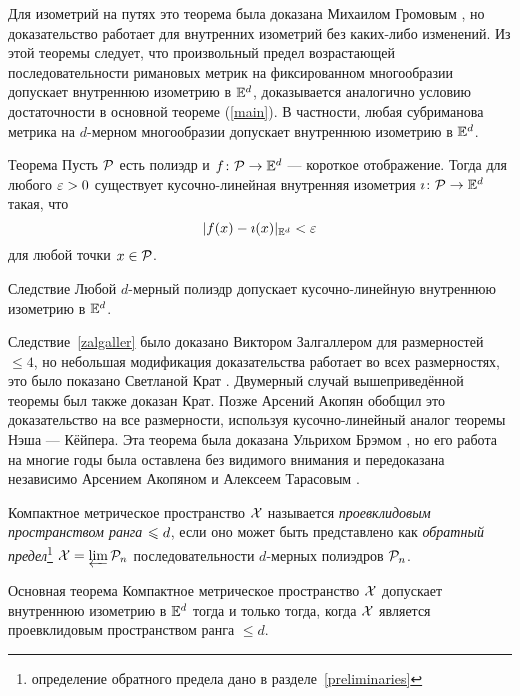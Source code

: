 \documentclass[oneside,a4paper]{article}
\begin{document}
Для изометрий на путях это теорема была доказана Михаилом Громовым \cite[2.4.11]{gromov-PDE},
но доказательство работает для внутренних изометрий  без каких-либо изменений.
Из этой теоремы следует, что произвольный предел возрастающей последовательности римановых метрик на фиксированном многообразии допускает внутреннюю изометрию в $\mathbb{E}^d$,
доказывается аналогично условию достаточности в основной теореме (\ref{main}).
В частности, любая субриманова метрика на $d$-мерном многообразии допускает внутреннюю изометрию в $\mathbb{E}^d$.

\begin{thm}{Теорема}\label{PL-Nash}
Пусть $\mathcal{P}$ есть полиэдр и $f\colon \mathcal{P}\to\mathbb{E}^d$ --- короткое отображение.
Тогда для любого $\varepsilon>0$ существует кусочно-линейная внутренняя изометрия $\imath\colon \mathcal{P}\to \mathbb{E}^d$ 
такая, что
$$|f(x)-\imath(x)|_{\mathbb{E}^d}<\varepsilon$$
для любой точки $x\in \mathcal{P}$.
\end{thm}

\begin{thm}{Следствие}\label{zalgaller}
Любой $d$-мерный полиэдр допускает кусочно-линейную внутреннюю изометрию в $\mathbb{E}^d$.
\end{thm}

Следствие~\ref{zalgaller} было доказано Виктором Залгаллером \cite{zalgaller} для размерностей $\le 4$, 
но небольшая модификация доказательства работает во всех размерностях,
это было показано Светланой Крат \cite{krat}.
Двумерный случай вышеприведённой теоремы был также доказан Крат.
Позже Арсений Акопян \cite{akopjan} обобщил это доказательство на все размерности,
используя кусочно-линейный аналог теоремы Нэша --- Кёйпера.
Эта теорема была доказана Ульрихом Брэмом \cite{brehm},
но его работа на многие годы была оставлена без видимого внимания
и передоказана независимо Арсением Акопяном и Алексеем Тарасовым \cite{akopjan-tarasov}.





Компактное метрическое пространство $\mathcal{X}$ 
называется \emph{проевклидовым пространством ранга $\z\le d$},
если оно может быть представлено как  \emph{обратный предел}\footnote{определение обратного предела дано в  разделе~\ref{preliminaries}} $\mathcal{X}=\varprojlim \mathcal{P}_n$ 
последовательности $d$-мерных полиэдров $\mathcal{P}_n$.

\begin{thm}{Основная теорема}\label{main}
Компактное метрическое пространство $\mathcal{X}$ 
допускает внутреннюю изометрию в $\mathbb{E}^d$ тогда и только тогда, когда $\mathcal{X}$ является проевклидовым пространством  ранга $\le d$. 
\end{thm}
\end{document}
